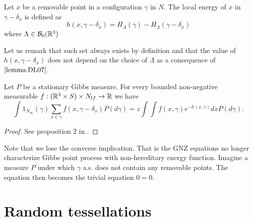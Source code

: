 \begin{definition}
	Let $x$ be a removable point in a configuration $\gamma$ in $N$. The local energy of $x$ in $\gamma - \delta_x$ is defined as
	$$h(x,\gamma - \delta_x) = H_\Lambda (\gamma) - H_\Lambda(\gamma - \delta_x)$$
	where $\Lambda \in \mathcal B_0({\mathbb R^3})$
\end{definition}
Let us remark that such set always exists by definition and that the value of $h(x,\gamma-\delta_x)$ does not depend on the choice of $\Lambda$ as a consequence of $\ref{lemma:DL07}$.


\begin{proposition}
	Let $P$ be a stationary Gibbs measure. For every bounded non-negative measurable $f:({\mathbb R^3}\times S) \times N_{lf}\to\mathbb R$ we have
	$$\int 1_{N_\infty}(\gamma) \sum_{x \in \gamma} f(x,\gamma -\delta_x) P(d\gamma) = z \int \int f(x,\gamma)e^{-h(x,\gamma)} dx P(d\gamma).$$
\end{proposition}
\begin{proof}
	See proposition $2$ in \cite{DereudreLavancier2007}.
\end{proof}

Note that we lose the converse implication. That is the GNZ equations no longer characterize Gibbs point process with non-hereditary energy function. Imagine a measure $P$ under which $\gamma$ a.s. does not contain any removable points. The equation then becomes the trivial equation $0=0$.





\section{Random tessellations}
